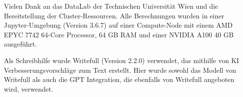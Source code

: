 \documentclass[draft,final]{vutinfth} %
\begin{document}
\newcommand{\aitool}[3]{
\textbf{\underline{#1:}}\vspace{.8em}\newline\textbf{Input:}\vspace{.3em}\newline#2\vspace{.6em}\newline \textbf{Output:}\vspace{.3em}\newline#3}


\frontmatter %

\addstatementpage

\begin{danksagung*}
Vielen Dank an das DataLab der Technischen Universität Wien und die Bereitstellung der Cluster-Ressourcen. Alle Berechnungen wurden in einer Jupyter-Umgebung (Version 3.6.7) auf einer Compute-Node mit einem AMD EPYC 7742 64-Core Processor, 64 GB RAM und einer NVIDIA A100 40 GB ausgeführt.

Als Schreibhilfe wurde Writefull (Version 2.2.0) verwendet, das mithilfe von KI Verbesserungsvorschläge zum Text erstellt. Hier wurde sowohl das Modell von Writefull als auch die GPT Integration, die ebenfalls von Writefull angeboten wird, verwendet.

\end{danksagung*}
\end{document}
